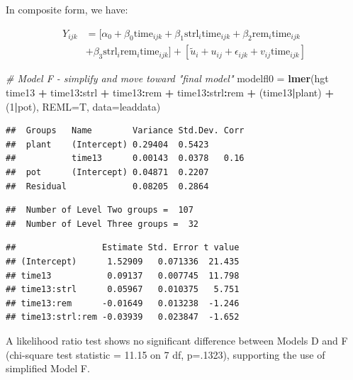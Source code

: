 \documentclass[
]{krantz}
\newenvironment{Shaded}{\begin{snugshade}}{\end{snugshade}}
\newcommand{\CommentTok}[1]{\textcolor[rgb]{0.37,0.37,0.37}{\textit{#1}}}
\newcommand{\DataTypeTok}[1]{\textcolor[rgb]{0.27,0.27,0.27}{#1}}
\newcommand{\DecValTok}[1]{\textcolor[rgb]{0.06,0.06,0.06}{#1}}
\newcommand{\KeywordTok}[1]{\textcolor[rgb]{0.27,0.27,0.27}{\textbf{#1}}}
\newcommand{\NormalTok}[1]{#1}
\newcommand{\OperatorTok}[1]{\textcolor[rgb]{0.43,0.43,0.43}{\textbf{#1}}}
\newcommand{\StringTok}[1]{\textcolor[rgb]{0.5,0.5,0.5}{#1}}
\begin{document}
In composite form, we have:

\begin{align*}
Y_{ijk} & = [\alpha_{0}+ \beta_{0}\textrm{time}_{ijk} + \beta_{1}\textrm{strl}_{i}\textrm{time}_{ijk} + \beta_{2}\textrm{rem}_{i}\textrm{time}_{ijk}  \\
 & + \beta_{3}\textrm{strl}_{i}\textrm{rem}_{i}\textrm{time}_{ijk}] + [\tilde{u}_{i}+u_{ij}+ \epsilon_{ijk}+ v_{ij}\textrm{time}_{ijk}]
\end{align*}

\begin{Shaded}
\begin{Highlighting}[]
\CommentTok{# Model F - simplify and move toward "final model"}
\NormalTok{modelfl0 =}\StringTok{ }\KeywordTok{lmer}\NormalTok{(hgt }\OperatorTok{~}\StringTok{ }\NormalTok{time13 }\OperatorTok{+}\StringTok{ }\NormalTok{time13}\OperatorTok{:}\NormalTok{strl }\OperatorTok{+}\StringTok{ }
\StringTok{  }\NormalTok{time13}\OperatorTok{:}\NormalTok{rem }\OperatorTok{+}\StringTok{ }\NormalTok{time13}\OperatorTok{:}\NormalTok{strl}\OperatorTok{:}\NormalTok{rem }\OperatorTok{+}
\StringTok{  }\NormalTok{(time13}\OperatorTok{|}\NormalTok{plant) }\OperatorTok{+}\StringTok{ }\NormalTok{(}\DecValTok{1}\OperatorTok{|}\NormalTok{pot), }\DataTypeTok{REML=}\NormalTok{T, }\DataTypeTok{data=}\NormalTok{leaddata)}
\end{Highlighting}
\end{Shaded}

\begin{verbatim}
##  Groups   Name        Variance Std.Dev. Corr
##  plant    (Intercept) 0.29404  0.5423       
##           time13      0.00143  0.0378   0.16
##  pot      (Intercept) 0.04871  0.2207       
##  Residual             0.08205  0.2864
\end{verbatim}

\begin{verbatim}
##  Number of Level Two groups =  107 
##  Number of Level Three groups =  32
\end{verbatim}

\begin{verbatim}
##                 Estimate Std. Error t value
## (Intercept)      1.52909   0.071336  21.435
## time13           0.09137   0.007745  11.798
## time13:strl      0.05967   0.010375   5.751
## time13:rem      -0.01649   0.013238  -1.246
## time13:strl:rem -0.03939   0.023847  -1.652
\end{verbatim}

A likelihood ratio test shows no significant difference between Models D and F (chi-square test statistic = 11.15 on 7 df, p=.1323), supporting the use of simplified Model F.
\end{document}
